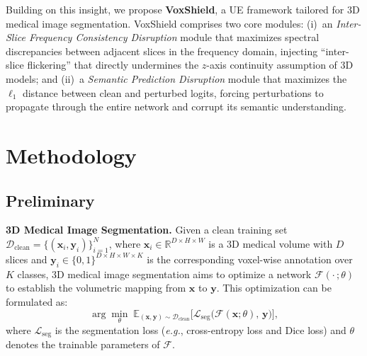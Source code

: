 \documentclass[runningheads]{llncs}
\begin{document}
Building on this insight, we propose \textbf{VoxShield}, a UE framework
tailored for 3D medical image segmentation. VoxShield comprises two core
modules: (i)~an \textit{Inter-Slice Frequency Consistency Disruption}
module that maximizes spectral discrepancies between adjacent slices in
the frequency domain, injecting ``inter-slice flickering'' that directly
undermines the $z$-axis continuity assumption of 3D models; and (ii)~a
\textit{Semantic Prediction Disruption} module that maximizes the
$\ell_1$ distance between clean and perturbed logits, forcing
perturbations to propagate through the entire network and corrupt its
semantic understanding.

\section{Methodology}

\subsection{Preliminary}
\label{sec:preliminary}

\textbf{3D Medical Image Segmentation.}\quad
Given a clean training set
$\mathcal{D}_{\mathrm{clean}}\!=\!\{(\bm{x}_i,\bm{y}_i)\}_{i=1}^{N}$,
where $\bm{x}_i\!\in\!\mathbb{R}^{D\times H\times W}$ is a 3D medical
volume with $D$ slices and
$\bm{y}_i\!\in\!\{0,1\}^{D\times H\times W\times K}$ is the
corresponding voxel-wise annotation over $K$ classes,
3D medical image segmentation aims to optimize a network
$\mathcal{F}(\cdot\,;\theta)$ to establish the volumetric mapping from
$\bm{x}$ to $\bm{y}$.
This optimization can be formulated as:
\begin{equation}
  \arg\min_{\theta}\;
  \mathbb{E}_{(\bm{x},\bm{y})\sim\mathcal{D}_{\mathrm{clean}}}
  \bigl[\mathcal{L}_{\mathrm{seg}}\!\bigl(
    \mathcal{F}(\bm{x};\theta),\,\bm{y}\bigr)\bigr],
  \label{eq:seg}
\end{equation}
where $\mathcal{L}_{\mathrm{seg}}$ is the segmentation loss
(\textit{e.g.}, cross-entropy loss and Dice loss)
and $\theta$ denotes the trainable parameters of $\mathcal{F}$.
\end{document}

